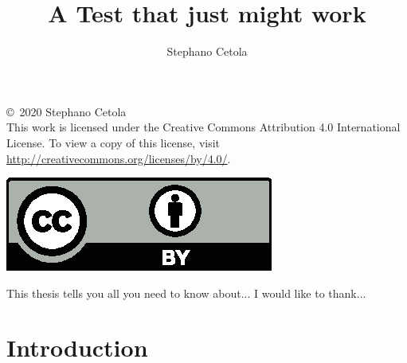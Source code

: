 \documentclass[12pt,oneside,letterpaper]{PSUreport}
\begin{document}
\title{A Test that just might work}
\subtitle{}
\author{Stephano Cetola}
\submitdate{\today}                                    %

\copyrightfalse
\figurespagefalse
\tablespagefalse
\null\vfill
\begin{center}
        \copyright\ 2020 Stephano Cetola \\
        This work is licensed under the Creative Commons Attribution 4.0 International License. To view a copy of this license, visit \url{http://creativecommons.org/licenses/by/4.0/}.
\end{center}
\begin{center}
\includegraphics{./img/by.eps}
\end{center}
\vfill\newpage
 
\beforepreface
{}
This thesis tells you all you need to know about...
I would like to thank...
\afterpreface

\printnoidxglossary[type=\acronymtype]

\glsresetall
\chapter{Introduction}




\end{document}
